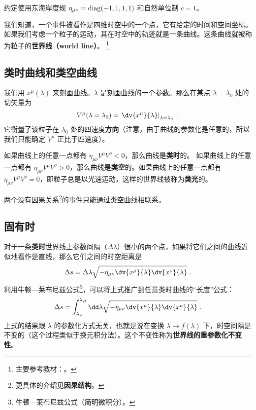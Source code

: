 

约定使用东海岸度规 $\eta_{\mu\nu}=\rm{diag}(-1,1,1,1)$ 和自然单位制 $c=1$。

我们知道，一个事件被看作是四维时空中的一个点，它有给定的时间和空间坐标。如果我们考虑一个粒子的运动，其在时空中的轨迹就是一条曲线。这条曲线就被称为粒子的\textbf{世界线（world line）}。
\footnote{主要参考教材：\cite{陈斌广相}。}

\subsection{类时曲线和类空曲线}
我们用 $x^\mu(\lambda)$ 来刻画曲线。$\lambda$ 是刻画曲线的一个参数。那么在某点 $\lambda=\lambda_0$ 处的切矢量为
\begin{equation}
\begin{aligned}
V^\mu(\lambda=\lambda_0)=\left.\dv{x^\mu}{\lambda}\right|_{\lambda=\lambda_0}~.
\end{aligned}
\end{equation}
它衡量了该粒子在 $\lambda_0$ 处的四速度\textbf{方向}（注意，由于曲线的参数化是任意的，所以我们只能确定 $V^\mu$ 正比于四速度）。

如果曲线上的任意一点都有 $\eta_{\mu\nu}V^\mu V^\nu<0$，那么曲线是\textbf{类时}的。
如果曲线上的任意一点都有 $\eta_{\mu\nu}V^\mu V^\nu>0$，那么曲线是\textbf{类空}的。如果曲线上的任意一点都有 $\eta_{\mu\nu}V^\mu V^\nu=0$，即粒子总是以光速运动，这样的世界线被称为\textbf{类光}的。

两个没有因果关系\footnote{更具体的介绍见\textbf{因果结构}。}的事件只能通过类空曲线相联系。

\subsection{固有时}
对于一条\textbf{类时}世界线上参数间隔（$\Delta \lambda$）很小的两个点，如果将它们之间的曲线近似地看作是直线，那么它们之间的时空距离是
\begin{equation}
\Delta s=\Delta \lambda \sqrt{-\eta_{\mu\nu}\dv{x^\mu}{\lambda} \dv{x^\nu}{\lambda}}~.
\end{equation}
利用牛顿—莱布尼兹公式\footnote{牛顿—莱布尼兹公式（简明微积分）。}，可以将上式推广到任意类时曲线的“长度”公式：
\begin{equation}\label{eq_wdline_2}
\Delta s=\int_{\lambda_A}^{\lambda_B} \dd\lambda \sqrt{-\eta_{\mu\nu}\dv{x^\mu}{\lambda} \dv{x^\nu}{\lambda}}~.
\end{equation}
上式的结果跟 $\lambda$ 的参数化方式无关，也就是说在变换 $\lambda\rightarrow f(\lambda)$ 下，时空间隔是不变的（这个过程类似于换元积分法）。这个不变性称为\textbf{世界线的重参数化不变性}。

